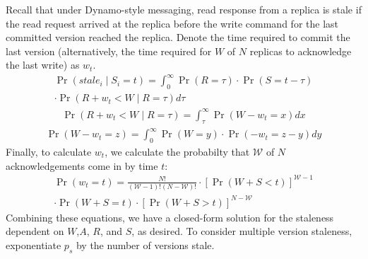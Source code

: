 \documentclass{vldb}
\begin{document}
\begin{appendix}
 Recall that under Dynamo-style messaging, read response from a
 replica is stale if the read request arrived at the replica before
 the write command for the last committed version reached the replica.
 Denote the time required to commit the last version (alternatively, the time required for $W$ of $N$ replicas to acknowledge the last write) as $w_t$.
\begin{multline*}
\Pr(stale_i \mid S_i = t) = \int_{0}^{\infty} \Pr(R=\tau)\cdot\Pr(S=t-\tau)\\\cdot\Pr(R+w_t < W \mid R = \tau) d\tau
\end{multline*}
\begin{multline*}
  \Pr(R+w_t < W \mid R = \tau) = \int_{\tau}^{\infty} \Pr(W-w_t = x) dx
\end{multline*}
\begin{multline*}
  \Pr(W-w_t = z) = \int_{0}^{\infty} \Pr(W = y) \cdot \Pr(-w_t = z-y) dy
\end{multline*}
Finally, to calculate $w_t$, we calculate the probabilty that
$\mathcal{W}$ of $N$ acknowledgements come in by time $t$:
\begin{multline*}
\Pr(w_t = t) = \frac{N!}{(\mathcal{W}-1)!(N-\mathcal{W})!}\cdot[\Pr(W+S< t)]^{\mathcal{W}-1}\\\cdot\Pr(W+S = t)\cdot[\Pr(W+S > t)]^{N-\mathcal{W}}
\end{multline*}
Combining these equations, we have a closed-form solution for the
staleness dependent on $W$,$A$, $R$, and $S$, as desired.  To consider
multiple version staleness, exponentiate $p_s$ by the number of
versions stale.

\end{appendix}
\end{document}
